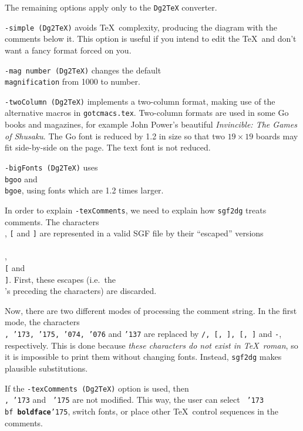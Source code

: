 The remaining options apply only to the {\tt Dg2TeX} converter.

{\tt -simple (Dg2TeX)} avoids \TeX\ complexity, producing the diagram with
the comments below it. This option is useful if you intend to edit
the \TeX\ and don't want a fancy format forced on you.

{\tt -mag number (Dg2TeX)} changes the default {\tt \\magnification} from 1000 to number.

{\tt -twoColumn (Dg2TeX)} implements a two-column format, making use of the alternative
macros in {\tt gotcmacs.tex}. Two-column formats are used in some Go books and
magazines, for example John Power's beautiful {\it Invincible: The Games of
Shusaku}. The Go font is reduced by 1.2 in size so that two $19\times 19$
boards may fit side-by-side on the page. The text font is not reduced.

{\tt -bigFonts (Dg2TeX)} uses {\tt \\bgoo} and {\tt \\bgoe}, using fonts which
are 1.2 times larger.

In order to explain {\tt -texComments}, we need to explain how
{\tt sgf2dg} treats comments. The characters {\tt \\},
{\tt [} and {\tt ]} are represented in a valid SGF file by their
``escaped'' versions {\tt \\\\}, {\tt \\[} and {\tt \\]}. First,
these escapes (i.e.\ the {\tt \\}'s preceding the characters) are discarded.

Now, there are two different modes of processing the comment string.
In the first mode, the characters {\tt \\, \char'173, \char'175, \char'074, 
\char'076} and {\tt \char'137} are replaced by {\tt /, [, ], [, ]} and {\tt -}, 
respectively. This is done because {\it these characters do not exist in \TeX\ 
roman}, so it is impossible to print them without changing fonts. Instead,
{\tt sgf2dg} makes plausible substitutions. 

If the {\tt -texComments (Dg2TeX)} option is used, then {\tt \\, \char'173} and {\tt
\char'175} are not modified. This way, the user can select {\tt
\char'173\\bf {\bf boldface}\char'175}, switch fonts, or place other \TeX\
control sequences in the comments.

